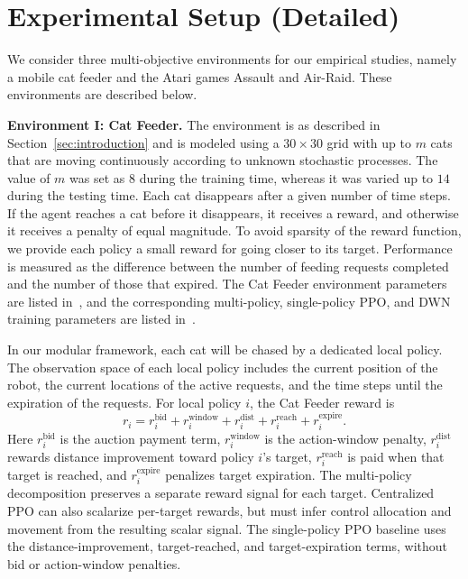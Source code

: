 \section{Experimental Setup (Detailed)}
\label{app:experimental setup}

We consider three multi-objective environments for our empirical studies, namely a mobile cat feeder and the Atari games Assault and Air-Raid.
These environments are described below.

\textbf{Environment I: Cat Feeder.} 
The environment is as described in Section~\ref{sec:introduction} and is modeled using a $30\times 30$ grid with up to $m$ cats that are moving continuously according to unknown stochastic processes.
The value of $m$ was set as $8$ during the training time, whereas it was varied up to $14$ during the testing time.
Each cat disappears after a given number of time steps.
If the agent reaches a cat before it disappears, it receives a reward, and otherwise it receives a penalty of equal magnitude.
To avoid sparsity of the reward function, we provide each policy a small reward for going closer to its target.
Performance is measured as the difference between the number of feeding requests completed and the number of those that expired.
The Cat Feeder environment parameters are listed in~, and the corresponding multi-policy, single-policy PPO, and DWN training parameters are listed in~.

In our modular framework, each cat will be chased by a dedicated local policy.
The observation space of each local policy includes the current position of the robot, the current locations of the active requests, and the time steps until the expiration of the requests.
For local policy $i$, the Cat Feeder reward is
\[
    r_i =
    r_i^{\mathrm{bid}}
    + r_i^{\mathrm{window}}
    + r_i^{\mathrm{dist}}
    + r_i^{\mathrm{reach}}
    + r_i^{\mathrm{expire}} .
\]
Here $r_i^{\mathrm{bid}}$ is the auction payment term, $r_i^{\mathrm{window}}$ is the action-window penalty, $r_i^{\mathrm{dist}}$ rewards distance improvement toward policy $i$'s target, $r_i^{\mathrm{reach}}$ is paid when that target is reached, and $r_i^{\mathrm{expire}}$ penalizes target expiration.
The multi-policy decomposition preserves a separate reward signal for each target.
Centralized PPO can also scalarize per-target rewards, but must infer control allocation and movement from the resulting scalar signal.
The single-policy PPO baseline uses the distance-improvement, target-reached, and target-expiration terms, without bid or action-window penalties.

